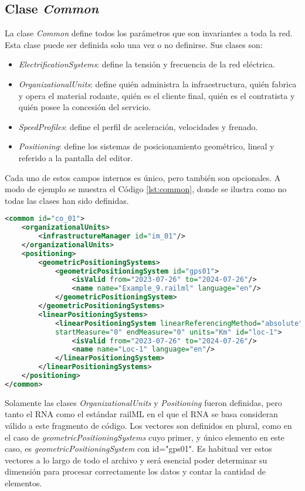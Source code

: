 \subsection{Clase \textit{Common}}
    \label{sec:common}

    La clase \textit{Common} define todos los parámetros que son invariantes a toda la red. Esta clase puede ser definida solo una vez o no definirse. Sus clases son:

    \begin{itemize}
        \item \textit{ElectrificationSystems}: define la tensión y frecuencia de la red eléctrica.
        \item \textit{OrganizationalUnits}: define quién administra la infraestructura, quién fabrica y opera el material rodante, quién es el cliente final, quién es el contratista y quién posee la concesión del servicio. 
        \item \textit{SpeedProfiles}: define el perfil de aceleración, velocidades y frenado.
        \item \textit{Positioning}: define los sistemas de posicionamiento geométrico, lineal y referido a la pantalla del editor.
    \end{itemize}

    Cada uno de estos campos internos es único, pero también son opcionales. A modo de ejemplo se muestra el Código \ref{lst:common}, donde se ilustra como no todas las clases han sido definidas.
    
    \begin{lstlisting}[language = XML, caption = Clase \textit{Common} , label = {lst:common}]
<common id="co_01">
    <organizationalUnits>
        <infrastructureManager id="im_01"/>
    </organizationalUnits>
    <positioning>
        <geometricPositioningSystems>
            <geometricPositioningSystem id="gps01">
                <isValid from="2023-07-26" to="2024-07-26"/>
                <name name="Example_9.railml" language="en"/>
            </geometricPositioningSystem>
        </geometricPositioningSystems>
        <linearPositioningSystems>
            <linearPositioningSystem linearReferencingMethod="absolute" 
            startMeasure="0" endMeasure="0" units="Km" id="loc-1">
                <isValid from="2023-07-26" to="2024-07-26"/>
                <name name="Loc-1" language="en"/>
            </linearPositioningSystem>
        </linearPositioningSystems>
    </positioning>
</common>
    \end{lstlisting}

    Solamente las clases \textit{OrganizationalUnits} y \textit{Positioning} fueron definidas, pero tanto el RNA como el estándar railML en el que el RNA se basa consideran válido a este fragmento de código. Los vectores son definidos en plural, como en el caso de \textit{geometricPositioningSystems} cuyo primer, y único elemento en este caso, es \textit{geometricPositioningSystem} con id="gps01". Es habitual ver estos vectores a lo largo de todo el archivo y será esencial poder determinar su dimensión para procesar correctamente los datos y contar la cantidad de elementos.